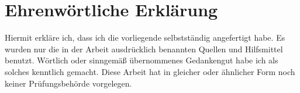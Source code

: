 \documentclass[
  11pt,
  openany, oneside]{book}
\begin{document}
\lorem


\backmatter

\printglossary[title=Glossar, toctitle=Glossar]
\label{tab:Glossar}





\chapter*{Ehrenw\"ortliche Erkl\"arung}
\label{tab:ehrenwoertlicheerklaerung}
\thispagestyle{empty}

Hiermit erkl\"are ich, dass ich die vorliegende \arbeitstyp  selbstst\"andig angefertigt habe. Es wurden nur die in der Arbeit ausdr\"ucklich benannten Quellen und Hilfsmittel benutzt. W\"ortlich oder sinngem\"aß \"ubernommenes Gedankengut habe ich als solches kenntlich gemacht. Diese Arbeit hat in gleicher oder \"ahnlicher Form noch keiner Pr\"ufungsbeh\"orde vorgelegen.

\vspace{2cm}
\noindent
\hspace*{\fill}

\ehrenwoertlicheErklaerung
\end{document}
